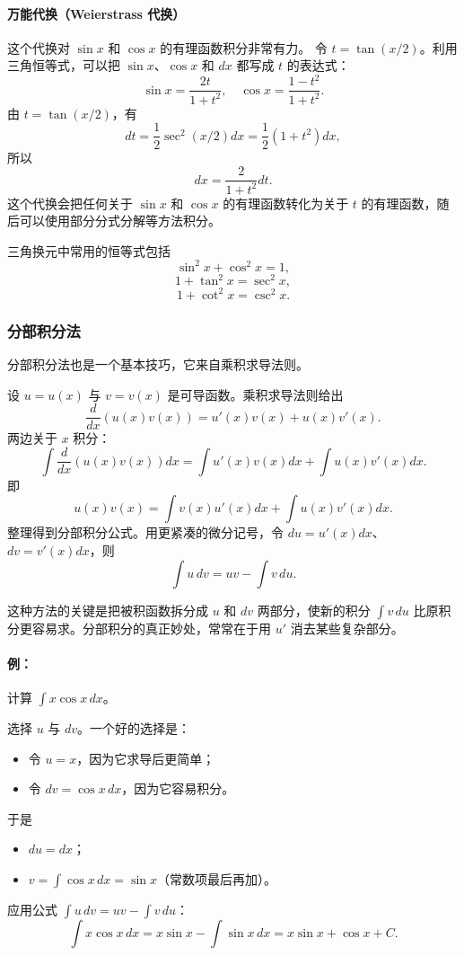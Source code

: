 \paragraph{万能代换（Weierstrass 代换）}
这个代换对 $\sin x$ 和 $\cos x$ 的有理函数积分非常有力。
令 $t=\tan(x/2)$。利用三角恒等式，可以把 $\sin x$、$\cos x$ 和 $dx$ 都写成 $t$ 的表达式：
\[
\sin x=\frac{2t}{1+t^2},\quad \cos x=\frac{1-t^2}{1+t^2}.
\]
由 $t=\tan(x/2)$，有
\[
dt=\frac{1}{2}\sec^2(x/2)dx=\frac{1}{2}(1+t^2)dx,
\]
所以
\[
dx=\frac{2}{1+t^2}dt.
\]
这个代换会把任何关于 $\sin x$ 和 $\cos x$ 的有理函数转化为关于 $t$ 的有理函数，随后可以使用部分分式分解等方法积分。

\begin{remark}
三角换元中常用的恒等式包括
\[
\sin^2x+\cos^2x=1,
\]
\[
1+\tan^2x=\sec^2x,
\]
\[
1+\cot^2x=\csc^2x.
\]
\end{remark}

\subsubsection{分部积分法}
分部积分法也是一个基本技巧，它来自乘积求导法则。

\begin{definition}[分部积分法]
设 $u=u(x)$ 与 $v=v(x)$ 是可导函数。乘积求导法则给出
\[
\frac{d}{dx}(u(x)v(x))=u'(x)v(x)+u(x)v'(x).
\]
两边关于 $x$ 积分：
\[
\int \frac{d}{dx}(u(x)v(x))dx=\int u'(x)v(x)dx+\int u(x)v'(x)dx.
\]
即
\[
u(x)v(x)=\int v(x)u'(x)dx+\int u(x)v'(x)dx.
\]
整理得到分部积分公式。用更紧凑的微分记号，令 $du=u'(x)dx$、$dv=v'(x)dx$，则
\[
\int u\,dv=uv-\int v\,du.
\]
\end{definition}

这种方法的关键是把被积函数拆分成 $u$ 和 $dv$ 两部分，使新的积分 $\int v\,du$ 比原积分更容易求。分部积分的真正妙处，常常在于用 $u'$ 消去某些复杂部分。

\paragraph*{例：}
计算 $\int x\cos x\,dx$。

选择 $u$ 与 $dv$。一个好的选择是：
\begin{itemize}
    \item 令 $u=x$，因为它求导后更简单；
    \item 令 $dv=\cos x\,dx$，因为它容易积分。
\end{itemize}
于是
\begin{itemize}
    \item $du=dx$；
    \item $v=\int \cos x\,dx=\sin x$（常数项最后再加）。
\end{itemize}
应用公式 $\int u\,dv=uv-\int v\,du$：
\[
\int x\cos x\,dx=x\sin x-\int \sin x\,dx=x\sin x+\cos x+C.
\]

